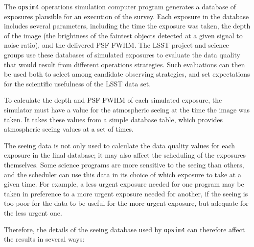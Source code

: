 \documentclass[\docopts]{\docclass}
\begin{document}
The \texttt{opsim4} operations simulation computer program generates a
database of exposures plausible for an execution of the survey. Each
exposure in the database includes several parameters, including the
time the exposure was taken, the depth of the image (the brightness of
the faintest objects detected at a given signal to noise ratio), and
the delivered PSF FWHM. The LSST project and science groups use these
databases of simulated exposures to evaluate the data quality that
would result from different operations strategies. Such evaluations
can then be used both to select among candidate observing strategies,
and set expectations for the scientific usefulness of the LSST data
set.

To calculate the depth and PSF FWHM of each simulated exposure, the
simulator must have a value for the atmospheric seeing at the time the
image was taken. It takes these values from a simple database table, which
provides atmospheric seeing values at a set of times.

The seeing data is not only used to calculate the data quality values
for each exposure in the final database; it may also affect the
scheduling of the exposures themselves. Some science programs are more
sensitive to the seeing than others, and the scheduler can
use this data in its choice of which exposure to take at a given
time. For example, a less urgent exposure needed for one program may
be taken in preference to a more urgent exposure needed for another,
if the seeing is too poor for the data to be useful for the more
urgent exposure, but adequate for the less urgent one.

Therefore, the details of the seeing database used by \texttt{opsim4}
can therefore affect the results in several ways:
\end{document}
